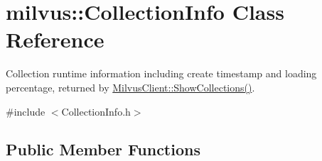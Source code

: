 \hypertarget{classmilvus_1_1_collection_info}{}\section{milvus\+:\+:Collection\+Info Class Reference}
\label{classmilvus_1_1_collection_info}


Collection runtime information including create timestamp and loading percentage, returned by \hyperlink{classmilvus_1_1_milvus_client_a8c5d625d72056a6e4f2f98607ebd0051}{Milvus\+Client\+::\+Show\+Collections()}.  




{\ttfamily \#include $<$Collection\+Info.\+h$>$}

\subsection*{Public Member Functions}
